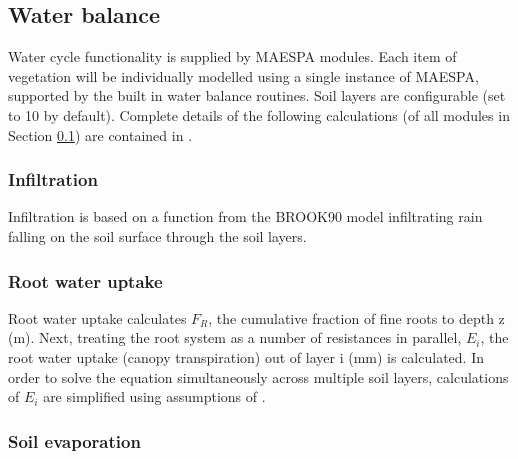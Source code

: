 \documentclass[final,3p,times,authoryear]{elsarticle}
\begin{document}

\subsection{Water balance}\label{sec:waterbalance}
Water cycle functionality is supplied by MAESPA modules. Each item of vegetation will be individually modelled using a single instance of MAESPA, supported by the built in water balance routines. Soil layers are configurable (set to 10 by default). Complete details of the following calculations (of all modules in Section \ref{sec:waterbalance}) are contained in \cite{Duursma2012}.



\subsubsection{Infiltration}

Infiltration is based on a function from the BROOK90 model \citep{Federer2003} infiltrating rain falling on the soil surface through the soil layers.





\subsubsection{Root water uptake}
Root water uptake calculates $F_{R}$, the cumulative fraction of fine roots to depth z (m). Next, treating the root system as a number of resistances in parallel, $E_{i}$, the root water uptake (canopy transpiration) out of layer i (mm) is calculated. In order to solve the equation simultaneously across multiple soil layers, calculations of $E_{i}$ are simplified using assumptions of \cite{Taylor1975}.



\subsubsection{Soil evaporation}\label{sec:soilevaporation}
\end{document}
